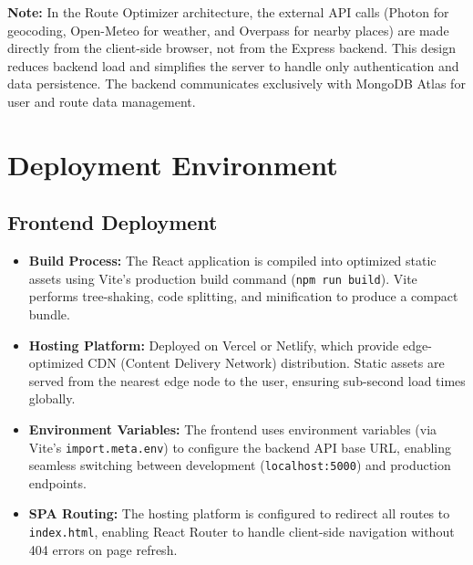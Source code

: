 \textbf{Note:} In the Route Optimizer architecture, the external API calls (Photon for geocoding, Open-Meteo for weather, and Overpass for nearby places) are made directly from the client-side browser, not from the Express backend. This design reduces backend load and simplifies the server to handle only authentication and data persistence. The backend communicates exclusively with MongoDB Atlas for user and route data management.

\section{Deployment Environment}

\subsection{Frontend Deployment}
\begin{itemize}
    \item \textbf{Build Process:} The React application is compiled into optimized static assets using Vite's production build command (\texttt{npm run build}). Vite performs tree-shaking, code splitting, and minification to produce a compact bundle.
    \item \textbf{Hosting Platform:} Deployed on Vercel or Netlify, which provide edge-optimized CDN (Content Delivery Network) distribution. Static assets are served from the nearest edge node to the user, ensuring sub-second load times globally.
    \item \textbf{Environment Variables:} The frontend uses environment variables (via Vite's \texttt{import.meta.env}) to configure the backend API base URL, enabling seamless switching between development (\texttt{localhost:5000}) and production endpoints.
    \item \textbf{SPA Routing:} The hosting platform is configured to redirect all routes to \texttt{index.html}, enabling React Router to handle client-side navigation without 404 errors on page refresh.
\end{itemize}


